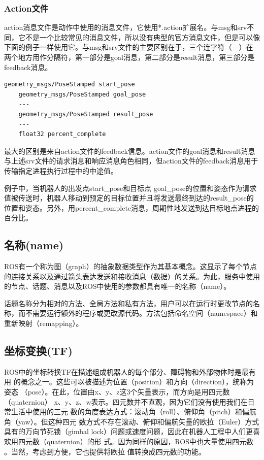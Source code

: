 \documentclass[geye,green,kindle,cn]{elegantnote}
\begin{document}
\subsubsection{Action文件}
action消息文件是动作中使用的消息文件，它使用*.action扩展名。与msg和srv不同，它不是一个比较常见的消息文件，所以没有典型的官方消息文件，但是可以像下面的例子一样使用它。与msg和srv文件的主要区别在于，三个连字符（---）在两个地方用作分隔符，第一部分是goal消息，第二部分是result消息，第三部分是feedback消息。
\begin{lstlisting}[frame=single,language=bash]
    geometry_msgs/PoseStamped start_pose 
    geometry_msgs/PoseStamped goal_pose 
    ---
    geometry_msgs/PoseStamped result_pose 
    ---
    float32 percent_complete 
\end{lstlisting}

最大的区别是来自action文件的feedback信息。action文件的goal消息和result消息与上述srv文件的请求消息和响应消息角色相同，但action文件的feedback消息用于传输指定进程执行过程中的中途值。

例子中，当机器人的出发点start\_pose和目标点 goal\_pose的位置和姿态作为请求值被传送时，机器人移动到预定的目标位置并且将发送最终到达的result\_pose的位置和姿态。另外，用percent\_complete消息，周期性地发送到达目标地点进程的百分比。 
\subsection{名称(name)}
ROS有一个称为图（graph）的抽象数据类型作为其基本概念。这显示了每个节点的连接关系以及通过箭头表达发送和接收消息（数据）的关系。为此，服务中使用的节点、话题、消息以及ROS中使用的参数都具有唯一的名称（name）。

话题名称分为相对的方法、全局方法和私有方法，用户可以在运行时更改节点的名称，而不需要运行额外的程序或更改源代码。方法包括命名空间（namespace）和重新映射（remapping）。
\subsection{坐标变换(TF)}
ROS中的坐标转换TF在描述组成机器人的每个部分、障碍物和外部物体时是最有用 的概念之一。这些可以被描述为位置（position）和方向（direction），统称为姿态 （pose）。在此，位置由x、y、z这3个矢量表示，而方向是用四元数（quaternion） x、y、z、w表示。四元数并不直观，因为它们没有使用我们在日常生活中使用的三元 数的角度表达方式：滚动角（roll）、俯仰角（pitch）和偏航角（yaw）。但这种四元 数方式不存在滚动、俯仰和偏航矢量的欧拉（Euler）方式具有的万向节死锁（gimbal lock）问题或速度问题，因此在机器人工程中人们更喜欢用四元数（quaternion）的形 式。因为同样的原因，ROS中也大量使用四元数 。当然，考虑到方便，它也提供将欧拉 值转换成四元数的功能。
\end{document}
